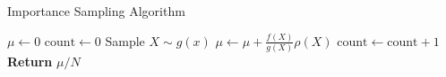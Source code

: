   \begin{algorithm}
    \caption{Importance Sampling Algorithm}
    \begin{algorithmic}[1]
    \State \( \mu \leftarrow 0 \) 
    \State \( \text{count} \leftarrow 0 \)
        \State Sample \( X \sim g(x) \) 
        \State \( \mu \leftarrow \mu + \frac{f(X)}{g(X)}\rho(X) \)
        \State \( \text{count} \leftarrow \text{count} + 1 \)
    \EndWhile
    \State \textbf{Return} \( \mu / N \) 
    \end{algorithmic}
    \label{importance_sampling}
\end{algorithm}
